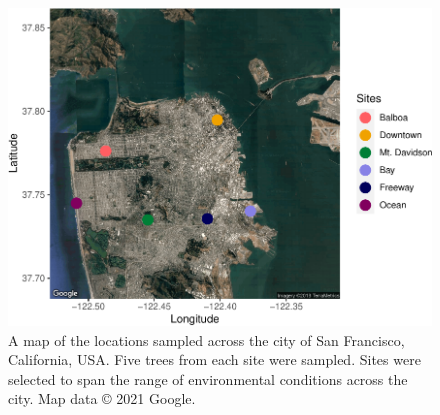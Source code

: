 \documentclass[fleqn,10pt,lineno]{wlpeerj} %
\begin{document}
\begin{figure}[p!]
\includegraphics{gibson2021_files/figure-latex/site-map-1} \caption{A map of the locations sampled across the city of San Francisco, California, USA. Five trees from each site were sampled. Sites were selected to span the range of environmental conditions across the city. Map data © 2021 Google.}\label{fig:site-map}
\end{figure}
\end{document}

